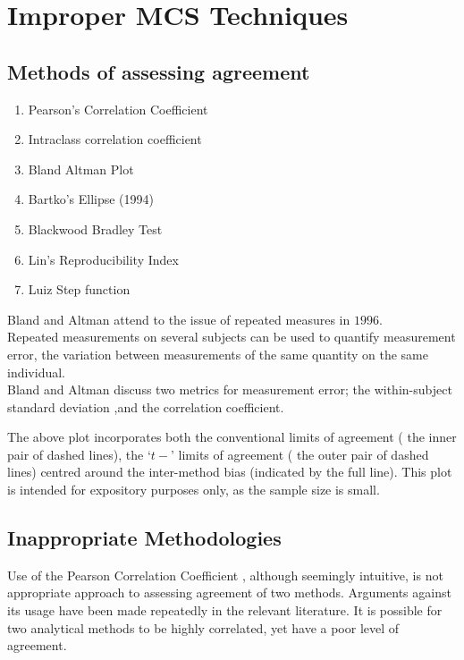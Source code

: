 \documentclass[12pt, a4paper]{report}
\theoremstyle{plain}
\theoremstyle{definition}
\theoremstyle{remark}
\begin{document}
	\newpage

	

	\chapter{Improper MCS Techniques}
	
	\section{Methods of assessing agreement}
	
	\begin{enumerate}
		\item Pearson's Correlation Coefficient\item Intraclass
		correlation coefficient \item Bland Altman Plot \item Bartko's
		Ellipse (1994) \item Blackwood Bradley Test \item Lin's
		Reproducibility Index \item Luiz Step function
	\end{enumerate}
	
	Bland and Altman attend to the issue of repeated measures in
	$1996$.
	\\
	Repeated measurements on several subjects can be used to quantify
	measurement error, the variation between measurements of the same
	quantity on the same individual.
	\\
	Bland and Altman discuss two metrics for measurement error; the
	within-subject standard deviation ,and the correlation
	coefficient.
	
	The above plot incorporates both the conventional limits of
	agreement ( the inner pair of dashed lines), the `$t-$' limits of
	agreement ( the outer pair of dashed lines) centred around the
	inter-method bias (indicated by the full line). This plot is
	intended for expository purposes only, as the sample size is
	small.
	
	
	
	
	
	
	\section{Inappropriate Methodologies} Use of the Pearson
	Correlation Coefficient , although seemingly intuitive, is not
	appropriate approach to assessing agreement of two methods.
	Arguments against its usage have been made repeatedly in the
	relevant literature. It is possible for two analytical methods to
	be highly correlated, yet have a poor level of agreement.
\end{document}
